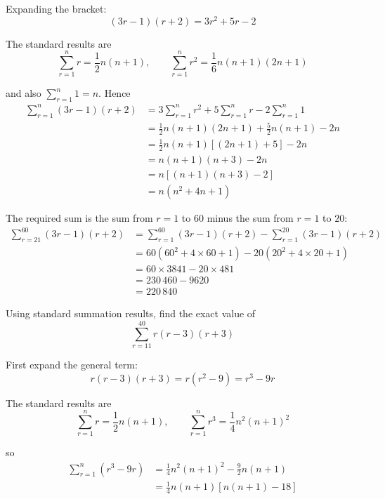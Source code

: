 \documentclass[leqno]{article}
\begin{document}
\begin{enumerate}[
  label=\textbf{\arabic*.},
  leftmargin=*,
  topsep=0pt,
  partopsep=0pt,
  parsep=0pt
]
\begin{djsSolution}
Expanding the bracket:
\[
(3r-1)(r+2)=3r^2+5r-2
\]

The standard results are
\[
\sum_{r=1}^{n} r=\frac12 n(n+1),\qquad \sum_{r=1}^{n} r^2=\frac16 n(n+1)(2n+1)
\]

and also \(\sum_{r=1}^{n} 1=n\). Hence
\begin{align*}
\sum_{r=1}^{n}(3r-1)(r+2)&=3\sum_{r=1}^{n} r^2+5\sum_{r=1}^{n} r-2\sum_{r=1}^{n} 1\\
&=\frac12 n(n+1)(2n+1)+\frac52 n(n+1)-2n\\
&=\frac12 n(n+1)\left[(2n+1)+5\right]-2n\\
&=n(n+1)(n+3)-2n\\
&=n\left[(n+1)(n+3)-2\right]\\
&=n\left(n^2+4n+1\right)
\end{align*}

The required sum is the sum from \(r=1\) to \(60\) minus the sum from \(r=1\) to \(20\):
\begin{align*}
\sum_{r=21}^{60}(3r-1)(r+2)&=\sum_{r=1}^{60}(3r-1)(r+2)-\sum_{r=1}^{20}(3r-1)(r+2)\\
&=60\left(60^2+4\times60+1\right)-20\left(20^2+4\times20+1\right)\\
&=60\times3841-20\times481\\
&=230\,460-9620\\
&=220\,840
\end{align*}
\end{djsSolution}

\newpage

\questionitem

Using standard summation results, find the exact value of
\[\sum_{r=11}^{40} r(r-3)(r+3)\] 

\vspace*{10pt}

\begin{djsSolution}
First expand the general term:
\[
r(r-3)(r+3)=r\left(r^2-9\right)=r^3-9r
\]

The standard results are
\[
\sum_{r=1}^{n} r=\frac12 n(n+1),\qquad \sum_{r=1}^{n} r^3=\frac14 n^2(n+1)^2
\]

so
\begin{align*}
\sum_{r=1}^{n}\left(r^3-9r\right)&=\frac14 n^2(n+1)^2-\frac92 n(n+1)\\
&=\frac14 n(n+1)\left[n(n+1)-18\right]
\end{align*}


\end{djsSolution}
\end{enumerate}
\end{document}

